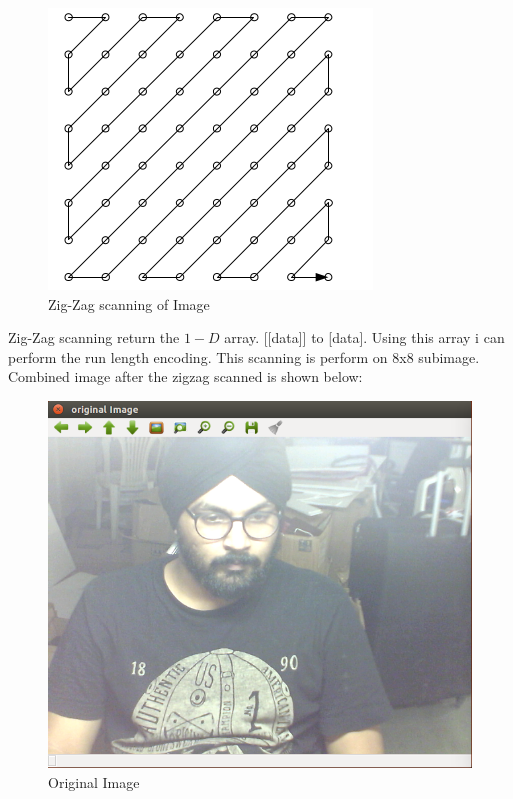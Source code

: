\documentclass[a4paper]{article}
\begin{document}
\begin{figure}[H]
    \centering
    \includegraphics[scale=0.5]{zig-zag.png}
    \caption{Zig-Zag scanning of Image \cite{book}}
    \label{fig:my_label}
\end{figure}

Zig-Zag scanning return the $1-D$ array. [[data]] to [data]. Using this array i can perform the run length encoding. This scanning is perform on 8x8 subimage. Combined image after the zigzag scanned is shown below:

\begin{figure}[H]
    \centering
    \includegraphics[scale=0.5]{original.png}
    \caption{Original Image}
    \label{fig:my_label}
\end{figure}
\end{document}
